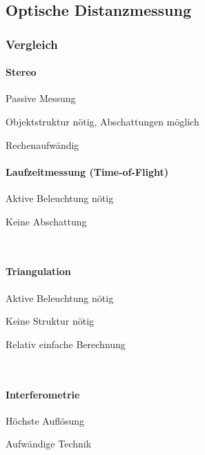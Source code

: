 \subsection{Optische Distanzmessung}
\subsubsection{Vergleich}
\begin{multicols}{4}
    \paragraph{Stereo}
    \begin{compactitem}
        \item Passive Messung
        \item Objektstruktur nötig, Abschattungen möglich
        \item Rechenaufwändig
    \end{compactitem}
    
    \paragraph{Laufzeitmessung (Time-of-Flight)}
    \begin{compactitem}
        \item Aktive Beleuchtung nötig
        \item Keine Abschattung
    \end{compactitem}
    \ \\
    
    \paragraph{Triangulation}
    \begin{compactitem}
        \item Aktive Beleuchtung nötig
        \item Keine Struktur nötig
        \item Relativ einfache Berechnung
    \end{compactitem}
    \ \\
    
    \paragraph{Interferometrie}
    \begin{compactitem}
        \item Höchste Auflösung
        \item Aufwändige Technik
    \end{compactitem}
    \ \\ \ \\ \ \\
\end{multicols}

